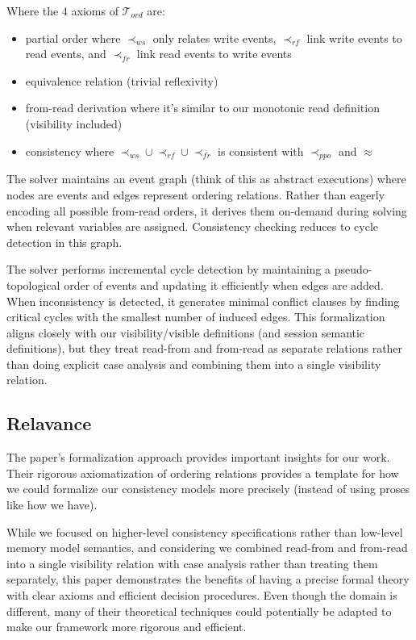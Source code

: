 {  Where the 4 axioms of $\mathcal{T}_{ord}$ are:

  \begin{itemize}
    \item partial order where $\prec_{ws}$ only relates write events,
      $\prec_{rf}$ link
      write events to read events, and $\prec_{fr}$ link read events to
      write events
    \item equivalence relation (trivial reflexivity)
    \item from-read derivation where it's similar to our monotonic
      read definition
      (visibility included)
    \item consistency where $\prec_{ws} \cup \prec_{rf} \cup \prec_{fr}$ is
      consistent with $\prec_{ppo}$ and $\approx$
  \end{itemize}

  The solver maintains an event graph (think of this as abstract
  executions) where
  nodes are events and edges represent ordering relations. Rather than eagerly
  encoding all possible from-read orders, it derives them on-demand
  during solving
  when relevant variables are assigned. Consistency checking reduces to cycle
  detection in this graph.

  The solver performs incremental cycle detection by maintaining a
  pseudo-topological order of events and updating it efficiently when edges are
  added. When inconsistency is detected, it generates minimal
  conflict clauses by
  finding critical cycles with the smallest number of induced edges. This
  formalization aligns closely with our visibility/visible definitions (and
  session semantic definitions), but they treat read-from and from-read as
  separate relations rather than doing explicit case analysis and combining them
  into a single visibility relation.

  \subsection{Relavance}

  The paper's formalization approach provides important insights for our work.
  Their rigorous axiomatization of ordering relations provides a
  template for how
  we could formalize our consistency models more precisely (instead of using
  proses like how we have).

  While we focused on higher-level consistency specifications rather than
  low-level memory model semantics, and considering we combined read-from and
  from-read into a single visibility relation with case analysis rather than
  treating them separately, this paper demonstrates the benefits of having a
  precise formal theory with clear axioms and efficient decision
  procedures. Even
  though the domain is different, many of their theoretical techniques could
  potentially be adapted to make our framework more rigorous and efficient.

}
